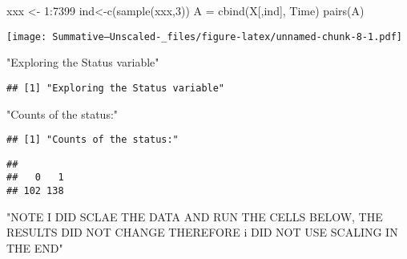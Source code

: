 \documentclass[
]{article}
\newenvironment{Shaded}{\begin{snugshade}}{\end{snugshade}}
\newcommand{\DecValTok}[1]{\textcolor[rgb]{0.00,0.00,0.81}{#1}}
\newcommand{\FunctionTok}[1]{\textcolor[rgb]{0.00,0.00,0.00}{#1}}
\newcommand{\NormalTok}[1]{#1}
\newcommand{\OtherTok}[1]{\textcolor[rgb]{0.56,0.35,0.01}{#1}}
\newcommand{\SpecialCharTok}[1]{\textcolor[rgb]{0.00,0.00,0.00}{#1}}
\newcommand{\StringTok}[1]{\textcolor[rgb]{0.31,0.60,0.02}{#1}}
\begin{document}
\begin{Shaded}
\begin{Highlighting}[]
\NormalTok{xxx }\OtherTok{\textless{}{-}} \DecValTok{1}\SpecialCharTok{:}\DecValTok{7399}
\NormalTok{ind}\OtherTok{\textless{}{-}}\FunctionTok{c}\NormalTok{(}\FunctionTok{sample}\NormalTok{(xxx,}\DecValTok{3}\NormalTok{))}
\NormalTok{A }\OtherTok{=} \FunctionTok{cbind}\NormalTok{(X[,ind], Time)}
\FunctionTok{pairs}\NormalTok{(A)}
\end{Highlighting}
\end{Shaded}

\texttt{[image: Summative--Unscaled-\_files/figure-latex/unnamed-chunk-8-1.pdf]}

\begin{Shaded}
\begin{Highlighting}[]
\StringTok{"Exploring the Status variable"}
\end{Highlighting}
\end{Shaded}

\begin{verbatim}
## [1] "Exploring the Status variable"
\end{verbatim}

\begin{Shaded}
\begin{Highlighting}[]
\StringTok{"Counts of the status:"}
\end{Highlighting}
\end{Shaded}

\begin{verbatim}
## [1] "Counts of the status:"
\end{verbatim}

\begin{Shaded}
\end{Shaded}

\begin{verbatim}
## 
##   0   1 
## 102 138
\end{verbatim}

\begin{Shaded}
\begin{Highlighting}[]
\StringTok{"NOTE I DID SCLAE THE DATA AND RUN THE CELLS BELOW, THE RESULTS DID NOT CHANGE THEREFORE i DID NOT USE SCALING IN THE END"}
\end{Highlighting}
\end{Shaded}
\end{document}
